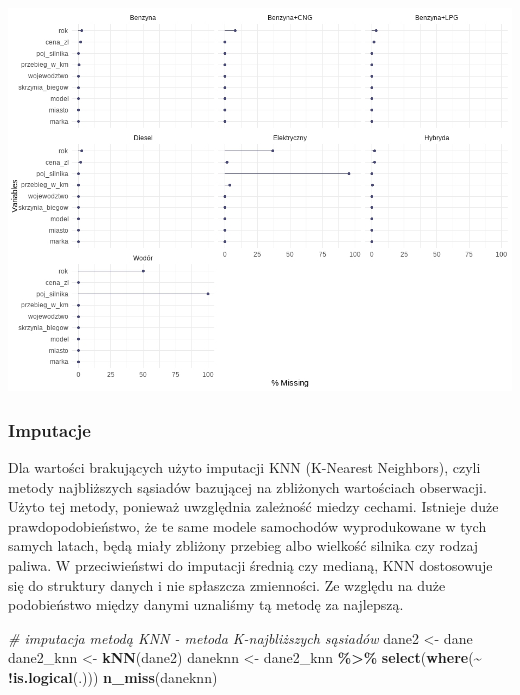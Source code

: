 \documentclass[
]{article}
\newenvironment{Shaded}{\begin{snugshade}}{\end{snugshade}}
\newcommand{\CommentTok}[1]{\textcolor[rgb]{0.56,0.35,0.01}{\textit{#1}}}
\newcommand{\FunctionTok}[1]{\textcolor[rgb]{0.13,0.29,0.53}{\textbf{#1}}}
\newcommand{\NormalTok}[1]{#1}
\newcommand{\OtherTok}[1]{\textcolor[rgb]{0.56,0.35,0.01}{#1}}
\newcommand{\SpecialCharTok}[1]{\textcolor[rgb]{0.81,0.36,0.00}{\textbf{#1}}}
\begin{document}
\includegraphics[width=1\linewidth]{images/12}

\subsubsection{Imputacje}\label{imputacje}

Dla wartości brakujących użyto imputacji KNN (K-Nearest Neighbors),
czyli metody najbliższych sąsiadów bazującej na zbliżonych wartościach
obserwacji. Użyto tej metody, ponieważ uwzględnia zależność miedzy
cechami. Istnieje duże prawdopodobieństwo, że te same modele samochodów
wyprodukowane w tych samych latach, będą miały zbliżony przebieg albo
wielkość silnika czy rodzaj paliwa. W przeciwieństwi do imputacji
średnią czy medianą, KNN dostosowuje się do struktury danych i nie
spłaszcza zmienności. Ze względu na duże podobieństwo między danymi
uznaliśmy tą metodę za najlepszą.

\begin{Shaded}
\begin{Highlighting}[]
\CommentTok{\# imputacja metodą KNN {-} metoda K{-}najbliższych sąsiadów}
\NormalTok{dane2 }\OtherTok{\textless{}{-}}\NormalTok{ dane}
\NormalTok{dane2\_knn }\OtherTok{\textless{}{-}} \FunctionTok{kNN}\NormalTok{(dane2)}
\NormalTok{daneknn }\OtherTok{\textless{}{-}}\NormalTok{ dane2\_knn }\SpecialCharTok{\%\textgreater{}\%} \FunctionTok{select}\NormalTok{(}\FunctionTok{where}\NormalTok{(}\SpecialCharTok{\textasciitilde{}} \SpecialCharTok{!}\FunctionTok{is.logical}\NormalTok{(.)))}
\FunctionTok{n\_miss}\NormalTok{(daneknn)}
\end{Highlighting}
\end{Shaded}
\end{document}
